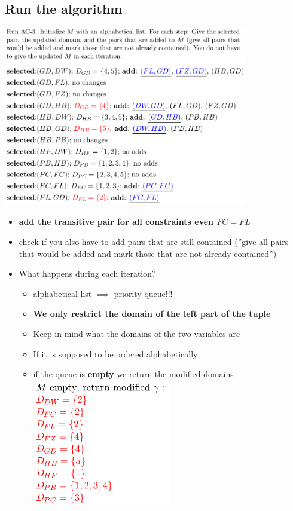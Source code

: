 \documentclass[conference]{styles/acmsiggraph}
\begin{document}
\subsection{Run the algorithm}

\includegraphics[width=0.8\textwidth]{imgs/ac-3.png}\\
\includegraphics[width=0.8\textwidth]{imgs/ac-32.png}

\begin{itemize}
    \item \textbf{add the transitive pair for all constraints even $FC=FL$}
    \item check if you also have to add pairs that are still contained (''give all pairs that would be added and mark those that are not already contained'')
    \item What happens during each iteration?
    \begin{itemize}
        \item alphabetical list $\implies$ priority queue!!!
        \item \textbf{We only restrict the domain of the left part of the tuple}
        \item Keep in mind what the domains of the two variables are
        \item If it is supposed to be ordered alphabetically 
        \item if the queue is \textbf{empty} we return the modified domains\\
        \includegraphics[width=0.5\textwidth]{imgs/result.png}
    \end{itemize}
\end{itemize}
\end{document}
